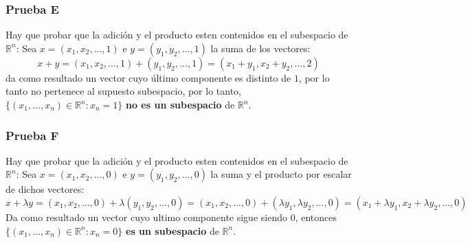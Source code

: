 \documentclass[a4paper,12pt]{article}
\begin{document}
\subsubsection{Prueba E}
Hay que probar que la adición y el producto esten contenidos en el subespacio de $\mathds{R}^n$: \newline
Sea $x=(x_1,x_2,...,1)$ e $y=(y_1,y_2,...,1)$ la suma de los vectores:
$$
x + y = (x_1,x_2,...,1) + (y_1,y_2,...,1) = (x_1+y_1,x_2+y_2,...,2)
$$
da como resultado un vector cuyo último componente es distinto de $1$, por lo tanto no pertenece al supuesto subespacio, por lo tanto, $\{ (x_1,...,x_n) \in  \mathds{R}^n : x_n=1 \}$ \textbf{no es un subespacio} de $\mathds{R}^n$.
\subsubsection{Prueba F}
Hay que probar que la adición y el producto esten contenidos en el subespacio de $\mathds{R}^n$: \newline
Sea $x=(x_1,x_2,...,0)$ e $y=(y_1,y_2,...,0)$ la suma y el producto por escalar de dichos vectores:
$$
x + \lambda y = (x_1,x_2,...,0) + \lambda (y_1,y_2,...,0) = (x_1,x_2,...,0) + (\lambda y_1, \lambda y_2,...,0) = (x_1 + \lambda y_1, x_2 + \lambda y_2,...,0)
$$
Da como resultado un vector cuyo ultimo componente sigue siendo $0$, entonces $\{ (x_1,...,x_n) \in  \mathds{R}^n : x_n=0 \}$ \textbf{es un subespacio} de $\mathds{R}^n$.
\end{document}
